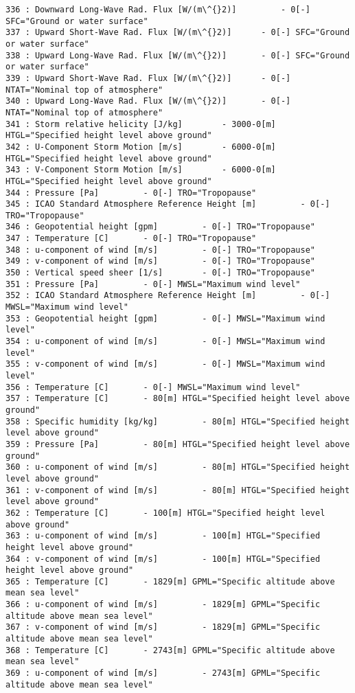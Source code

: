 \documentclass[11pt]{article}
\begin{document}
\begin{Verbatim}[commandchars=\\\{\}]
336 : Downward Long-Wave Rad. Flux [W/(m\^{}2)] 		- 0[-] SFC="Ground or water surface"
337 : Upward Short-Wave Rad. Flux [W/(m\^{}2)] 		- 0[-] SFC="Ground or water surface"
338 : Upward Long-Wave Rad. Flux [W/(m\^{}2)] 		- 0[-] SFC="Ground or water surface"
339 : Upward Short-Wave Rad. Flux [W/(m\^{}2)] 		- 0[-] NTAT="Nominal top of atmosphere"
340 : Upward Long-Wave Rad. Flux [W/(m\^{}2)] 		- 0[-] NTAT="Nominal top of atmosphere"
341 : Storm relative helicity [J/kg] 		- 3000-0[m] HTGL="Specified height level above ground"
342 : U-Component Storm Motion [m/s] 		- 6000-0[m] HTGL="Specified height level above ground"
343 : V-Component Storm Motion [m/s] 		- 6000-0[m] HTGL="Specified height level above ground"
344 : Pressure [Pa] 		- 0[-] TRO="Tropopause"
345 : ICAO Standard Atmosphere Reference Height [m] 		- 0[-] TRO="Tropopause"
346 : Geopotential height [gpm] 		- 0[-] TRO="Tropopause"
347 : Temperature [C] 		- 0[-] TRO="Tropopause"
348 : u-component of wind [m/s] 		- 0[-] TRO="Tropopause"
349 : v-component of wind [m/s] 		- 0[-] TRO="Tropopause"
350 : Vertical speed sheer [1/s] 		- 0[-] TRO="Tropopause"
351 : Pressure [Pa] 		- 0[-] MWSL="Maximum wind level"
352 : ICAO Standard Atmosphere Reference Height [m] 		- 0[-] MWSL="Maximum wind level"
353 : Geopotential height [gpm] 		- 0[-] MWSL="Maximum wind level"
354 : u-component of wind [m/s] 		- 0[-] MWSL="Maximum wind level"
355 : v-component of wind [m/s] 		- 0[-] MWSL="Maximum wind level"
356 : Temperature [C] 		- 0[-] MWSL="Maximum wind level"
357 : Temperature [C] 		- 80[m] HTGL="Specified height level above ground"
358 : Specific humidity [kg/kg] 		- 80[m] HTGL="Specified height level above ground"
359 : Pressure [Pa] 		- 80[m] HTGL="Specified height level above ground"
360 : u-component of wind [m/s] 		- 80[m] HTGL="Specified height level above ground"
361 : v-component of wind [m/s] 		- 80[m] HTGL="Specified height level above ground"
362 : Temperature [C] 		- 100[m] HTGL="Specified height level above ground"
363 : u-component of wind [m/s] 		- 100[m] HTGL="Specified height level above ground"
364 : v-component of wind [m/s] 		- 100[m] HTGL="Specified height level above ground"
365 : Temperature [C] 		- 1829[m] GPML="Specific altitude above mean sea level"
366 : u-component of wind [m/s] 		- 1829[m] GPML="Specific altitude above mean sea level"
367 : v-component of wind [m/s] 		- 1829[m] GPML="Specific altitude above mean sea level"
368 : Temperature [C] 		- 2743[m] GPML="Specific altitude above mean sea level"
369 : u-component of wind [m/s] 		- 2743[m] GPML="Specific altitude above mean sea level"

\end{Verbatim}
\end{document}

